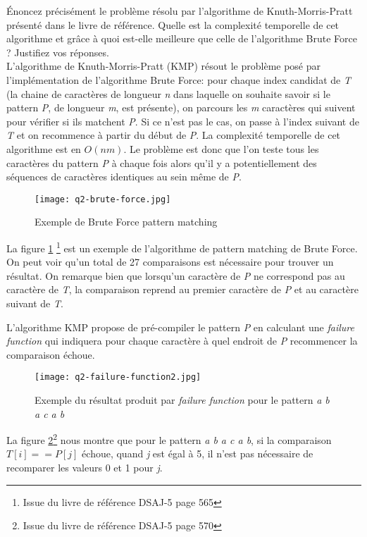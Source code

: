 Énoncez précisément le problème résolu par l’algorithme de Knuth-Morris-Pratt
présenté dans le livre de référence. Quelle est la complexité temporelle de cet algorithme et grâce à quoi est-elle meilleure que celle de l’algorithme Brute Force ?
Justifiez vos réponses.
\\

L'algorithme de Knuth-Morris-Pratt (KMP) résout le problème posé par l'implémentation de l'algorithme Brute Force: pour chaque index candidat de \textit{T} (la chaine de caractères de longueur \textit{n} dans laquelle on souhaite savoir si le pattern \textit{P}, de longueur \textit{m}, est présente), on parcours les \textit{m} caractères qui suivent pour vérifier si ils matchent \textit{P}. Si ce n'est pas le cas, on passe à l'index suivant de \textit{T} et on recommence à partir du début de \textit{P}.
La complexité temporelle de cet algorithme est en $O(n m)$.
Le problème est donc que l'on teste tous les caractères du pattern \textit{P} à chaque fois alors qu'il y a potentiellement des séquences de caractères identiques au sein même de \textit{P}.\\
\begin{figure}[h]
	\centering
	\texttt{[image: q2-brute-force.jpg]}
	\caption{Exemple de Brute Force pattern matching}
	\label{fig:bruteforce}
\end{figure}
La figure \ref{fig:bruteforce} \footnote{Issue du livre de référence DSAJ-5 page 565} est un exemple de l'algorithme de pattern matching de Brute Force. On peut voir qu'un total de 27 comparaisons est nécessaire pour trouver un résultat. On remarque bien que lorsqu'un caractère de \textit{P} ne correspond pas au caractère de \textit{T}, la comparaison reprend au premier caractère de \textit{P} et au caractère suivant de \textit{T}.
			 

L'algorithme KMP propose de pré-compiler le pattern \textit{P} en calculant une \textit{failure function} qui indiquera pour chaque caractère à quel endroit de \textit{P} recommencer la comparaison échoue.
\begin{figure}[h]
	\centering
	\texttt{[image: q2-failure-function2.jpg]}
	\caption{Exemple du résultat produit par \textit{failure function} pour le pattern \textit{a b a c a b}}
	\label{fig:failurefunction}
\end{figure}
La figure \ref{fig:failurefunction}\footnote{Issue du livre de référence DSAJ-5 page 570} nous montre que pour le pattern \textit{a b a c a b}, si la comparaison $T[i] == P[j]$ échoue, quand \textit{j} est égal à 5, il n'est pas nécessaire de recomparer les valeurs 0 et 1 pour \textit{j}.

